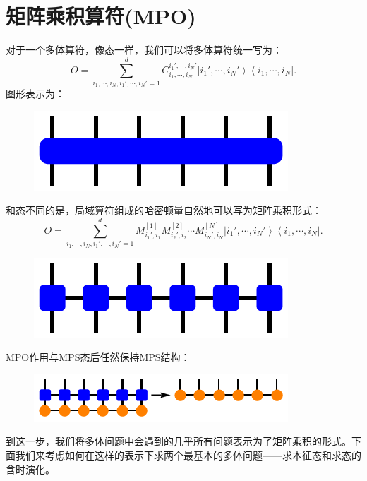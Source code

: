 \documentclass[UTF8]{ctexart}
\begin{document}
\section*{矩阵乘积算符(MPO)}
对于一个多体算符，像态一样，我们可以将多体算符统一写为：
\begin{equation}
	O=\sum_{i_{1},\cdots,i_{N},i_{1}',\cdots,i_{N}'=1}^{d}C_{i_{1},\cdots,i_{N}}^{i_{1}',\cdots,i_{N}'}\left|i_{1}',\cdots,i_{N}'\right\rangle \left\langle i_{1},\cdots,i_{N}\right|.
\end{equation}
图形表示为：
\begin{figure}[H]
\begin{centering}
\includegraphics[width=0.4\linewidth]{include/p11}
\par\end{centering}
\end{figure}
\noindent 和态不同的是，局域算符组成的哈密顿量自然地可以写为矩阵乘积形式：
\begin{equation}
	O=\sum_{i_{1},\cdots,i_{N},i_{1}',\cdots,i_{N}'=1}^{d}M_{i_{1}',i_{1}}^{\left[1\right]}M_{i_{2}',i_{2}}^{\left[2\right]}\cdots M_{i_{N}',i_{N}}^{\left[N\right]}\left|i_{1}',\cdots,i_{N}'\right\rangle \left\langle i_{1},\cdots,i_{N}\right|.
\end{equation}
\begin{figure}[H]
\begin{centering}
\includegraphics[width=0.4\linewidth]{include/p12}
\par\end{centering}
\end{figure}
\noindent MPO作用与MPS态后任然保持MPS结构：
\begin{figure}[H]
\begin{centering}
\includegraphics[width=0.6\linewidth]{include/p13}
\par\end{centering}
\end{figure}
\noindent 到这一步，我们将多体问题中会遇到的几乎所有问题表示为了矩阵乘积的形式。下面我们来考虑如何在这样的表示下求两个最基本的多体问题——求本征态和求态的含时演化。
\end{document}
